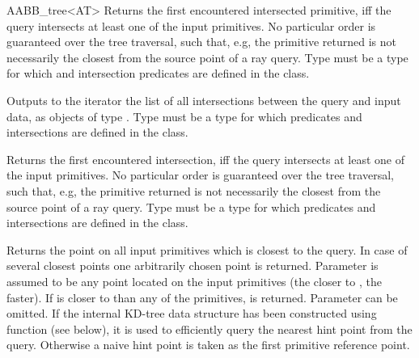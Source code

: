 \begin{ccRefClass}{AABB_tree<AT>}
{Returns the first encountered intersected primitive, iff the query intersects at least one of the input primitives. No particular order is guaranteed over the tree traversal, such that, e.g, the primitive returned is not necessarily the closest from the source point of a ray query. Type  must be a type for which  and intersection predicates are defined in the  class.}


	
{Outputs to the iterator the list of all intersections between the query and input data, as objects of type . Type  must be a type for which  predicates and intersections are defined in the  class.}

{Returns the first encountered intersection, iff the query intersects at least one of the input primitives. No particular order is guaranteed over the tree traversal, such that, e.g, the primitive returned is not necessarily the closest from the source point of a ray query. Type  must be a type for which  predicates and intersections are defined in the  class.}




{Returns the point on all input primitives which is closest to the query. In case of several closest points one arbitrarily chosen point is returned.  Parameter  is assumed to be any point located on the input primitives (the closer  to , the faster). If  is closer to  than any of the primitives,  is returned. Parameter  can be omitted. If the internal KD-tree data structure has been constructed using function  (see below), it is used to efficiently query the nearest hint point from the query. Otherwise a naive hint point is taken as the first primitive reference point. }


\end{ccRefClass}
